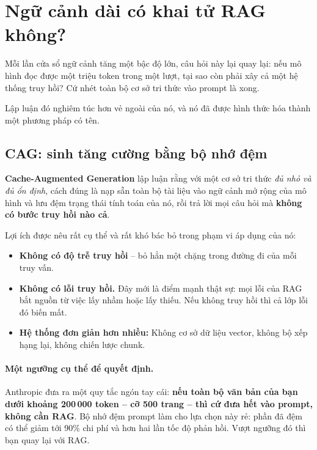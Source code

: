 
\section{Ngữ cảnh dài có khai tử RAG không?}
\label{sec:rag_vs_long_context}

Mỗi lần cửa sổ ngữ cảnh tăng một bậc độ lớn, câu hỏi này lại quay lại: nếu mô hình đọc được một triệu token trong một lượt, tại sao còn phải xây cả một hệ thống truy hồi? Cứ nhét toàn bộ cơ sở tri thức vào prompt là xong.

Lập luận đó nghiêm túc hơn vẻ ngoài của nó, và nó đã được hình thức hóa thành một phương pháp có tên.

\subsection{CAG: sinh tăng cường bằng bộ nhớ đệm}
\label{ssec:cag}

\textbf{Cache-Augmented Generation} \cite{chan2024cag} lập luận rằng với một cơ sở tri thức \emph{đủ nhỏ và đủ ổn định}, cách đúng là nạp sẵn toàn bộ tài liệu vào ngữ cảnh mở rộng của mô hình và lưu đệm trạng thái tính toán của nó, rồi trả lời mọi câu hỏi mà \textbf{không có bước truy hồi nào cả}.

Lợi ích được nêu rất cụ thể và rất khó bác bỏ trong phạm vi áp dụng của nó:
\begin{itemize}
	\item \textbf{Không có độ trễ truy hồi} -- bỏ hẳn một chặng trong đường đi của mỗi truy vấn.
	\item \textbf{Không có lỗi truy hồi.} Đây mới là điểm mạnh thật sự: mọi lỗi của RAG bắt nguồn từ việc lấy nhầm hoặc lấy thiếu. Nếu không truy hồi thì cả lớp lỗi đó biến mất.
	\item \textbf{Hệ thống đơn giản hơn nhiều:} Không cơ sở dữ liệu vector, không bộ xếp hạng lại, không chiến lược chunk.
\end{itemize}

\paragraph{Một ngưỡng cụ thể để quyết định.} Anthropic đưa ra một quy tắc ngón tay cái: \textbf{nếu toàn bộ văn bản của bạn dưới khoảng 200\,000 token -- cỡ 500 trang -- thì cứ đưa hết vào prompt, không cần RAG}. Bộ nhớ đệm prompt làm cho lựa chọn này rẻ: phần đã đệm có thể giảm tới 90\% chi phí và hơn hai lần tốc độ phản hồi. Vượt ngưỡng đó thì bạn quay lại với RAG.

